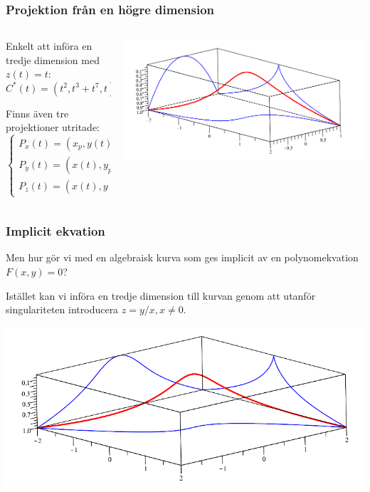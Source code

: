 \documentclass{beamer}
\begin{document}
\begin{frame}
	\frametitle{Projektion från en högre dimension}
	\begin{columns}[onlytextwidth]
		\begin{column}{0.4\textwidth}
			Enkelt att införa en tredje dimension med $z(t)=t$:
			\[C^*(t)=(t^2,t^3+t^7,t)\]
			
			Finns även tre projektioner utritade: 
			\[\left\{\begin{array}{l}
			P_x(t)=(x_p,y(t),z(t))\\
			P_y(t)=(x(t),y_p,z(t))\\
			P_z(t)=(x(t),y(t),z_p)
			\end{array}\right.\]
		\end{column}
		\begin{column}{0.6\textwidth}
			\begin{center}
				\includegraphics[scale=0.5]{Export/blowupex1_2.png}
			\end{center}
		\end{column}
	\end{columns}	
\end{frame}

\begin{frame}
	\frametitle{Implicit ekvation}
	Men hur gör vi med en algebraisk kurva som ges implicit av en polynomekvation $F(x,y)=0$?
	
	Istället kan vi införa en tredje dimension till kurvan genom att utanför singulariteten introducera $z=y/x, x \neq 0$.

	\begin{center}
		\includegraphics[scale=0.5]{Export/blowupex1_3.png}
	\end{center}
\end{frame}
\end{document}
